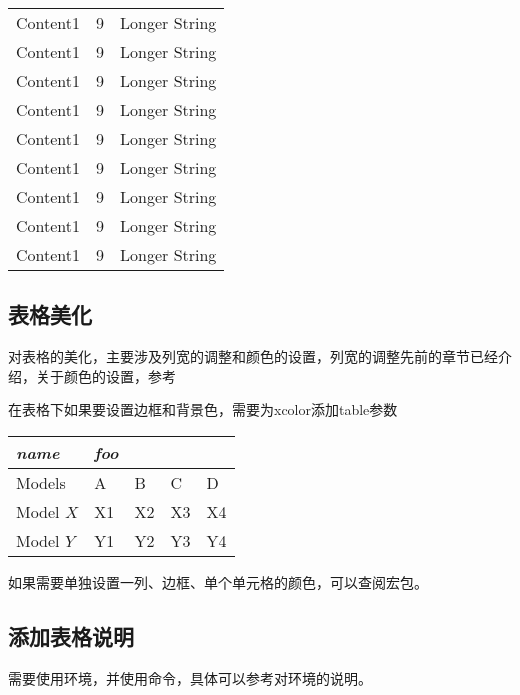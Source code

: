 \begin{center}
\begin{longtable}{|l|l|>{\centering\arraybackslash}p{}|}
            Content1&9&Longer String\\%
            Content1&9&Longer String\\%
            Content1&9&Longer String\\%
            Content1&9&Longer String\\%
            Content1&9&Longer String\\%
            Content1&9&Longer String\\%
            Content1&9&Longer String\\%
            Content1&9&Longer String\\%
            Content1&9&Longer String\\%
        \end{longtable}%
    \end{center}



    \subsection{表格美化}\label{table-beauty}
    对表格的美化，主要涉及列宽的调整和颜色的设置，列宽的调整先前的章节已经介绍，关于颜色的设置，参考

    在表格下如果要设置边框和背景色，需要为xcolor添加table参数
    
    
    
    \begin{texcode}\usepackage[table]{xcolor}\end{texcode}
    \begin{texshow}
        \begin{tabular}{lllll}
            \toprule
            \emph{name} & \emph{foo} &&&  \\\midrule
            Models    & A  & B  & C  & D  \\
            \rowcolor{blue!50} Model $X$ & X1 & X2 & X3 & X4\\
            \rowcolor{green!50} Model $Y$ & Y1 & Y2 & Y3 & Y4\\\bottomrule
            \hline
        \end{tabular}
    \end{texshow}
    
    如果需要单独设置一列、边框、单个单元格的颜色，可以查阅宏包。

    \subsection{添加表格说明}
    需要使用环境，并使用命令，具体可以参考对环境的说明。

